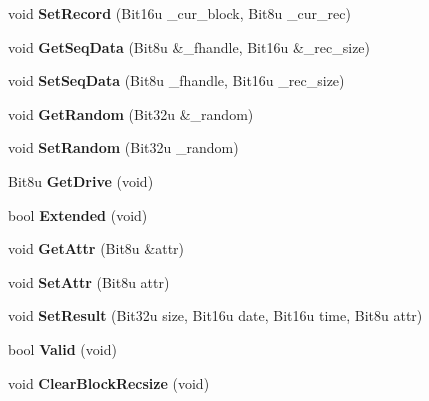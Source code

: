 \begin{DoxyCompactItemize}
\item 
\hypertarget{classDOS__FCB_aa4f8785c2b5e67e613e38a2663cc08b2}{void {\bfseries Set\-Record} (Bit16u \-\_\-cur\-\_\-block, Bit8u \-\_\-cur\-\_\-rec)}\label{classDOS__FCB_aa4f8785c2b5e67e613e38a2663cc08b2}

\item 
\hypertarget{classDOS__FCB_a2e9b07c8a0a281e21f6151e4766cd741}{void {\bfseries Get\-Seq\-Data} (Bit8u \&\-\_\-fhandle, Bit16u \&\-\_\-rec\-\_\-size)}\label{classDOS__FCB_a2e9b07c8a0a281e21f6151e4766cd741}

\item 
\hypertarget{classDOS__FCB_abf271ce081ed4cd9e6ec5dd8b8b8aad0}{void {\bfseries Set\-Seq\-Data} (Bit8u \-\_\-fhandle, Bit16u \-\_\-rec\-\_\-size)}\label{classDOS__FCB_abf271ce081ed4cd9e6ec5dd8b8b8aad0}

\item 
\hypertarget{classDOS__FCB_ab49248721f42da4974744a8810027230}{void {\bfseries Get\-Random} (Bit32u \&\-\_\-random)}\label{classDOS__FCB_ab49248721f42da4974744a8810027230}

\item 
\hypertarget{classDOS__FCB_aa6d6128bfcca69f73790e0e07be677da}{void {\bfseries Set\-Random} (Bit32u \-\_\-random)}\label{classDOS__FCB_aa6d6128bfcca69f73790e0e07be677da}

\item 
\hypertarget{classDOS__FCB_a6da07c697a956f04f9df2fa0cb9249ab}{Bit8u {\bfseries Get\-Drive} (void)}\label{classDOS__FCB_a6da07c697a956f04f9df2fa0cb9249ab}

\item 
\hypertarget{classDOS__FCB_ad4a466929e2135cbbf36cce3f93c1009}{bool {\bfseries Extended} (void)}\label{classDOS__FCB_ad4a466929e2135cbbf36cce3f93c1009}

\item 
\hypertarget{classDOS__FCB_aead0618722ff1f674547679cd38451ad}{void {\bfseries Get\-Attr} (Bit8u \&attr)}\label{classDOS__FCB_aead0618722ff1f674547679cd38451ad}

\item 
\hypertarget{classDOS__FCB_ac0a82ec6f3d72a69d54579fa640c5669}{void {\bfseries Set\-Attr} (Bit8u attr)}\label{classDOS__FCB_ac0a82ec6f3d72a69d54579fa640c5669}

\item 
\hypertarget{classDOS__FCB_a8f79505e07fa52a67461932141d3e12f}{void {\bfseries Set\-Result} (Bit32u size, Bit16u date, Bit16u time, Bit8u attr)}\label{classDOS__FCB_a8f79505e07fa52a67461932141d3e12f}

\item 
\hypertarget{classDOS__FCB_ab247afb9301a93fb192cd8d60acf6219}{bool {\bfseries Valid} (void)}\label{classDOS__FCB_ab247afb9301a93fb192cd8d60acf6219}

\item 
\hypertarget{classDOS__FCB_a31e05f1f41a0b62d5988e828d960d9b5}{void {\bfseries Clear\-Block\-Recsize} (void)}\label{classDOS__FCB_a31e05f1f41a0b62d5988e828d960d9b5}

\end{DoxyCompactItemize}


